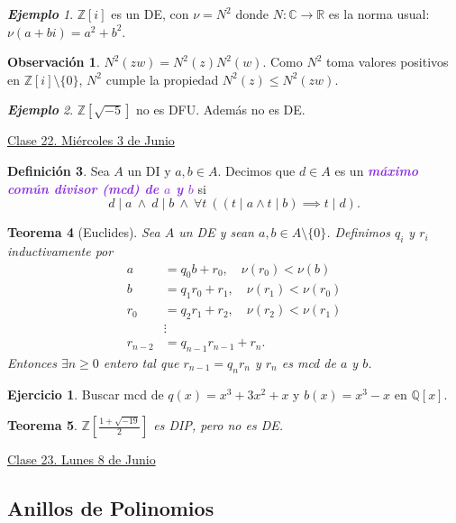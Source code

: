 \documentclass{article}
\newtheorem{theorem}{Teorema}[subsection]
\theoremstyle{definition}
\newtheorem{definition}[theorem]{Definición}
\newtheorem{exercise}{Ejercicio}
\newtheorem*{obs}{Observación}
\theoremstyle{remark}
\newtheorem{example}[theorem]{\textbf{Ejemplo}}
\numberwithin{equation}{section}
\newcommand{\C}{\mathbb{C}}
\newcommand{\Q}{\mathbb{Q}}
\newcommand{\R}{\mathbb{R}}
\newcommand{\Z}{\mathbb{Z}}
\newcommand{\br}[1]{\left( #1 \right)}
\newcommand{\cor}[1]{\left[ #1 \right]}
\newcommand{\wea}[1]{\textcolor{BlueViolet}{\textbf{\emph{#1}}}}
\newcommand{\fecha}[1]{\begin{flushright} \underline{#1} \end{flushright}}
\begin{document}
\begin{example}
  $\Z[i]$ es un DE, con $\nu = N^2$ donde $N \colon \C \to \R$ es la norma usual: $\nu(a+bi) = a^2 + b^2$.
\end{example}

\begin{obs}
  $N^2(zw) = N^2(z) N^2(w)$. Como $N^2$ toma valores positivos en $\Z[i] \setminus \{0\}$, $N^2$ cumple la propiedad $N^2(z) \leq N^2(zw)$. 
\end{obs}

\begin{example}
  $\Z[\sqrt{-5}]$ no es DFU. Además no es DE.
\end{example}

\fecha{Clase 22. Miércoles 3 de Junio}

\begin{definition}
  Sea $A$ un DI y $a,b \in A$. Decimos que $d \in A$ es un \wea{máximo común divisor (mcd) de $a$ y $b$} si
  \[ d \mid a \ \land \ d \mid b \ \land \ \forall t \ \br{(t \mid a \land t \mid b) \implies t \mid d}. \]
\end{definition}

\begin{theorem}
  [Euclides]
  Sea $A$ un DE y sean $a,b \in A \setminus \{0\}$. Definimos $q_i$ y $r_i$ inductivamente por
  \begin{align*}
      a &= q_0 b + r_0, \quad \nu(r_0) < \nu(b) \\
      b &= q_1 r_0 + r_1, \quad \nu(r_1) < \nu(r_0) \\
      r_0 &= q_2 r_1 + r_2, \quad \nu(r_2) < \nu(r_1) \\
      &\vdots \\
      r_{n-2} &= q_{n-1} r_{n-1} + r_n.
  \end{align*}
  Entonces $\exists n \geq 0$ entero tal que $r_{n-1} = q_n r_n$ y $r_n$ es mcd de $a$ y $b$.
\end{theorem}

\begin{exercise}
  Buscar mcd de $q(x) = x^3 + 3x^2 + x$ y $b(x) = x^3 - x$ en $\Q[x]$.
\end{exercise}

\begin{theorem}
  $\Z\cor{\frac{1+\sqrt{-19}}{2}}$ es DIP, pero no es DE.
\end{theorem}

\newpage
\fecha{Clase 23. Lunes 8 de Junio}
\subsection{Anillos de Polinomios}
\end{document}
